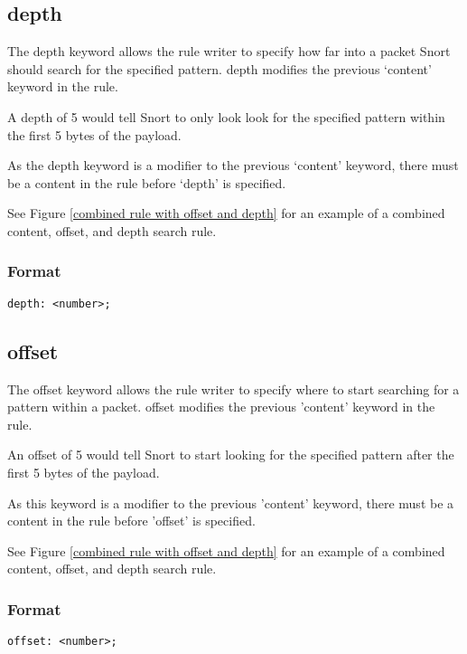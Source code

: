\documentclass[english]{report}
\begin{document}
\subsection{depth\label{sub:depth}}

The depth keyword allows the rule writer to specify how far into a packet Snort
should search for the specified pattern.  depth modifies the previous `content'
keyword in the rule.

A depth of 5 would tell Snort to only look look for the specified pattern
within the first 5 bytes of the payload.

As the depth keyword is a modifier to the previous `content' keyword, there
must be a content in the rule before `depth' is specified.

See Figure \ref{combined rule with offset and depth} for an example of a
combined content, offset, and depth search rule.

\subsubsection{Format}

\begin{verbatim}
depth: <number>;
\end{verbatim}

\subsection{offset}

The offset keyword allows the rule writer to specify where to start searching
for a pattern within a packet.  offset modifies the previous 'content' keyword
in the rule.

An offset of 5 would tell Snort to start looking for the specified pattern
after the first 5 bytes of the payload.

As this keyword is a modifier to the previous 'content' keyword, there must be
a content in the rule before 'offset' is specified.

See Figure \ref{combined rule with offset and depth} for an example of a
combined content, offset, and depth search rule.

\subsubsection{Format}

\begin{verbatim}
offset: <number>;
\end{verbatim}
\end{document}
